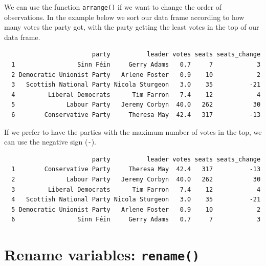 \documentclass[12pt,oneside]{reedthesis}
\theoremstyle{definition}
\theoremstyle{definition}
\theoremstyle{definition}
\theoremstyle{remark}
\begin{document}
  We can use the function \texttt{arrange()} if we want to change the
  order of observations. In the example below we sort our data frame
  according to how many votes the party got, with the party getting the
  least votes in the top of our data frame.
  \begin{Shaded}
  \begin{Highlighting}[]
  \end{Highlighting}
  \end{Shaded}
  \begin{verbatim}
                        party          leader votes seats seats_change
  1                 Sinn Féin     Gerry Adams   0.7     7            3
  2 Democratic Unionist Party   Arlene Foster   0.9    10            2
  3   Scottish National Party Nicola Sturgeon   3.0    35          -21
  4         Liberal Democrats      Tim Farron   7.4    12            4
  5              Labour Party   Jeremy Corbyn  40.0   262           30
  6        Conservative Party     Theresa May  42.4   317          -13
  \end{verbatim}
  If we prefer to have the parties with the maximum number of votes in the
  top, we can use the negative sign (\texttt{-}).
  \begin{Shaded}
  \begin{Highlighting}[]
  \OperatorTok{-}
  \end{Highlighting}
  \end{Shaded}
  \begin{verbatim}
                        party          leader votes seats seats_change
  1        Conservative Party     Theresa May  42.4   317          -13
  2              Labour Party   Jeremy Corbyn  40.0   262           30
  3         Liberal Democrats      Tim Farron   7.4    12            4
  4   Scottish National Party Nicola Sturgeon   3.0    35          -21
  5 Democratic Unionist Party   Arlene Foster   0.9    10            2
  6                 Sinn Féin     Gerry Adams   0.7     7            3
  \end{verbatim}
  \section{\texorpdfstring{Rename variables:
  \texttt{rename()}}{Rename variables: rename()}}\label{rename-variables-rename}
  
\end{document}
